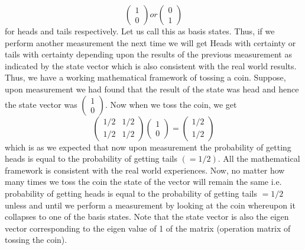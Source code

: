 \documentclass[12pt, oneside]{book}
\theoremstyle{definition}
\theoremstyle{definition}
\theoremstyle{remark}
\begin{document}
\[
\begin{pmatrix} 1 \\ 0 \end{pmatrix} or \begin{pmatrix} 0 \\ 1 \end{pmatrix} 
\]
 for heads and tails respectively. Let us call this as basis states. Thus, if we perform another measurement the next time we will get Heads with certainty or tails with certainty depending upon the results of the previous measurement as indicated by the state vector which is also consistent with the real world results. Thus, we have a working mathematical framework of tossing a coin. Suppose, upon measurement we had found that the result of the state was head and hence the state vector was $\begin{pmatrix} 1 \\ 0 \end{pmatrix}$. Now when we toss the coin, we get
 \[
 \begin{pmatrix} 1/2 & 1/2 \\ 1/2 & 1/2 \end{pmatrix} \begin{pmatrix} 1 \\ 0 \end{pmatrix} = \begin{pmatrix} 1/2 \\ 1/2 \end{pmatrix}
 \]
 which is as we expected that now upon measurement the probability of getting heads is equal to the probability of getting tails $(=1/2)$. All the mathematical framework is consistent with the real world experiences. Now, no matter how many times we toss the coin the state of the vector will remain the same i.e. probability of getting heads is equal to the probability of getting tails $=1/2$ unless and until we perform a measurement by looking at the coin whereupon it collapses to one of the basis states.
Note that the state vector is also the eigen vector corresponding to the eigen value of 1 of the matrix (operation matrix of tossing the coin).
\end{document}
